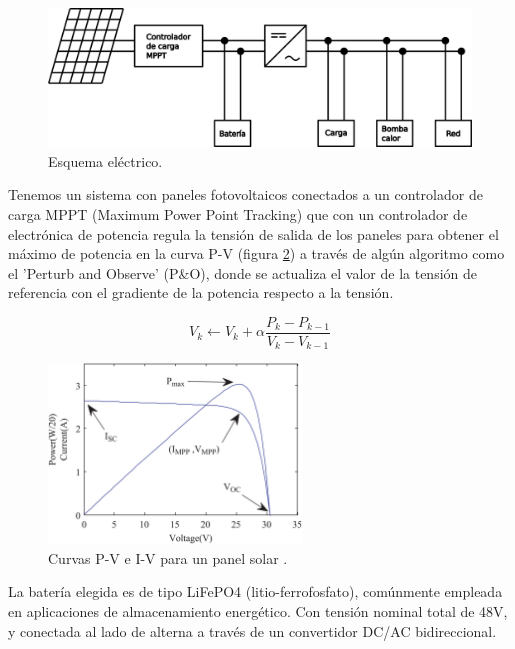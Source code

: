 \begin{figure}[h] \centering
	\centering
	\includegraphics[width=1\textwidth]{./capitulos/resultados_discusion/images/diagrama_electrico.png}
	\caption{Esquema eléctrico.}
	\label{fig:electic_diagram}
\end{figure}

Tenemos un sistema con paneles fotovoltaicos conectados a un controlador de
carga MPPT (Maximum Power Point Tracking) que con un controlador de electrónica
de potencia regula la tensión de salida de los paneles para obtener el máximo
de potencia en la curva P-V (figura \ref{fig:solar_P-V_I-V}) a través de algún
algoritmo como el 'Perturb and Observe' (P\&O), donde se actualiza el valor de
la tensión de referencia con el gradiente de la potencia respecto a la tensión.

\begin{equation}
	V_{k} \leftarrow V_k + \alpha \frac{P_k - P_{k-1}}{V_{k}-V_{k-1}}
\end{equation}

\begin{figure}[h] \centering
	\centering
	\includegraphics[width=0.6\textwidth]{./capitulos/resultados_discusion/images/solar_P-V_I-V.jpg}
	\caption{Curvas P-V e I-V para un panel solar \cite{podder2019mppt}.}
	\label{fig:solar_P-V_I-V}
\end{figure}


La batería elegida es de tipo LiFePO4 (litio-ferrofosfato), comúnmente
empleada en aplicaciones de almacenamiento energético. Con tensión nominal
total de 48V, y conectada al lado de alterna a través de un convertidor
DC/AC bidireccional.


